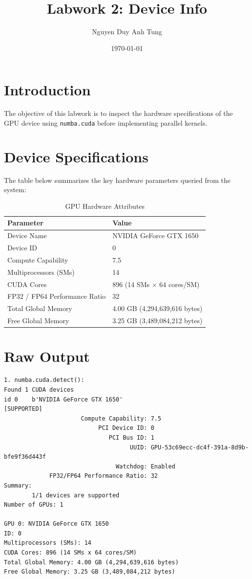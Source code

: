 \documentclass[11pt,a4paper]{article}
\title{Labwork 2: Device Info}
\author{Nguyen Duy Anh Tung}
\date{\today}
\begin{document}
\maketitle

\section{Introduction}
The objective of this labwork is to inspect the hardware specifications of the GPU device using \texttt{numba.cuda} before implementing parallel kernels.

\section{Device Specifications}
The table below summarizes the key hardware parameters queried from the system:

\begin{table}[ht]
\centering
\begin{tabular}{ll}
\toprule
\textbf{Parameter} & \textbf{Value} \\
\midrule
Device Name & NVIDIA GeForce GTX 1650 \\
Device ID & 0 \\
Compute Capability & 7.5 \\
Multiprocessors (SMs) & 14 \\
CUDA Cores & 896 (14 SMs $\times$ 64 cores/SM) \\
FP32 / FP64 Performance Ratio & 32 \\
Total Global Memory & 4.00 GB (4,294,639,616 bytes) \\
Free Global Memory & 3.25 GB (3,489,084,212 bytes) \\
\bottomrule
\end{tabular}
\caption{GPU Hardware Attributes}
\end{table}

\section{Raw Output}
\begin{verbatim}
1. numba.cuda.detect():
Found 1 CUDA devices
id 0    b'NVIDIA GeForce GTX 1650'                              [SUPPORTED]
                      Compute Capability: 7.5
                           PCI Device ID: 0
                              PCI Bus ID: 1
                                    UUID: GPU-53c69ecc-dc4f-391a-8d9b-bfe9f36d443f
                                Watchdog: Enabled
             FP32/FP64 Performance Ratio: 32
Summary:
        1/1 devices are supported
Number of GPUs: 1

GPU 0: NVIDIA GeForce GTX 1650
ID: 0
Multiprocessors (SMs): 14
CUDA Cores: 896 (14 SMs x 64 cores/SM)
Total Global Memory: 4.00 GB (4,294,639,616 bytes)
Free Global Memory: 3.25 GB (3,489,084,212 bytes)
\end{verbatim}
\end{document}
